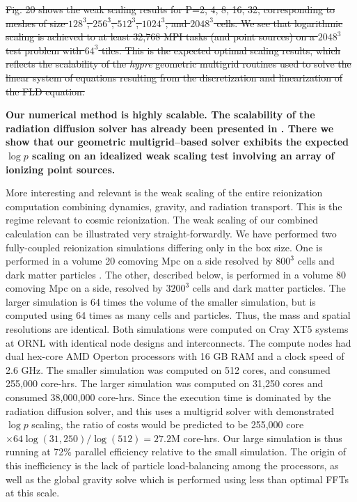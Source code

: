 \st{ Fig. 20 shows the weak scaling results for P=2, 4, 8, 16, 32, corresponding to meshes of size $128^3$, $256^3$, $512^3$, $1024^3$, and $2048^3$ cells. We see that logarithmic scaling is achieved to at least 32,768 MPI tasks (and point sources) on a $2048^3$ test problem with $64^3$ tiles. This is the expected optimal scaling results, which reflects the scalability of the {\em hypre} geometric multigrid routines used to solve the linear system of equations resulting from the discretization and linearization of the FLD equation. }

{\bf Our numerical method is highly scalable. The scalability of the radiation diffusion solver has already been presented in \cite{ReynoldsHayesPaschosNorman2009}. There we show that our geometric multigrid--based solver exhibits the expected $\log p$ scaling on an idealized weak scaling test involving an array of ionizing point sources. 

More interesting and relevant is the weak scaling of the entire reionization computation combining dynamics, gravity, and radiation transport. This is the regime relevant to cosmic reionization. The weak scaling of our combined calculation can be illustrated very straight-forwardly. We have performed two fully-coupled reionization simulations differing only in the box size. One is performed in a volume 20 comoving Mpc on a side resolved by $800^3$ cells and dark matter particles \citep{So2014}. The other, described below, is performed in a volume 80 comoving Mpc on a side, resolved by $3200^3$ cells and dark matter particles. The larger simulation is 64 times the volume of the smaller simulation, but is computed using 64 times as many cells and particles. Thus, the mass and spatial resolutions are identical. Both simulations were computed on Cray XT5 systems at ORNL with identical node designs and interconnects. The compute nodes had dual hex-core AMD Operton processors with 16 GB RAM and a clock speed of 2.6 GHz. The smaller simulation was computed on 512 cores, and consumed 255,000 core-hrs. The larger simulation was computed on 31,250 cores and consumed 38,000,000 core-hrs. Since the execution time is dominated by the radiation diffusion solver, and this uses a multigrid solver with demonstrated $\log p$ scaling, the ratio of costs would be predicted to be 255,000 core $\times 64 \log (31,250) / \log(512) = 27.2$M core-hrs. Our large simulation is thus running at 72\% parallel efficiency relative to the small simulation. The origin of this inefficiency is the lack of particle load-balancing among the processors, as well as the global gravity solve which is performed using less than optimal FFTs at this scale. }

